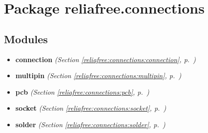 %
%
%


\section{Package reliafree.connections}

    \label{reliafree:connections}


\subsection{Modules}

\begin{itemize}
\setlength{\parskip}{0ex}
\item \textbf{connection}
  \textit{(Section \ref{reliafree:connections:connection}, p.~\pageref{reliafree:connections:connection})}

\item \textbf{multipin}
  \textit{(Section \ref{reliafree:connections:multipin}, p.~\pageref{reliafree:connections:multipin})}

\item \textbf{pcb}
  \textit{(Section \ref{reliafree:connections:pcb}, p.~\pageref{reliafree:connections:pcb})}

\item \textbf{socket}
  \textit{(Section \ref{reliafree:connections:socket}, p.~\pageref{reliafree:connections:socket})}

\item \textbf{solder}
  \textit{(Section \ref{reliafree:connections:solder}, p.~\pageref{reliafree:connections:solder})}

\end{itemize}



